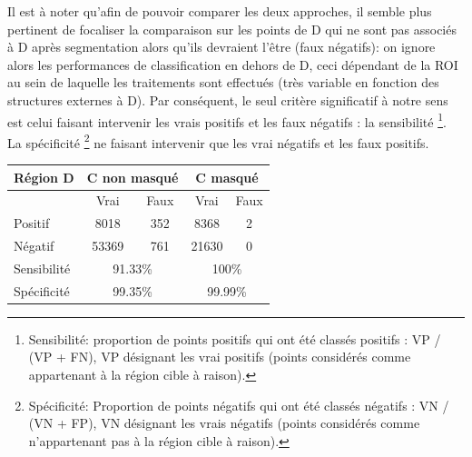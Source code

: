 Il est à noter qu'afin de pouvoir comparer les deux approches, il semble plus pertinent de focaliser la comparaison sur les points de D qui ne sont pas associés à D après segmentation alors qu'ils devraient l'être (faux négatifs): on ignore alors les performances de classification en dehors de D, ceci dépendant de la ROI au sein de laquelle les traitements sont effectués (très variable en fonction des structures externes à D). Par conséquent, le seul critère significatif à notre sens est celui faisant intervenir les vrais positifs et les faux négatifs : la sensibilité \footnote{Sensibilité: proportion de points positifs qui ont été classés positifs : VP / (VP + FN), VP désignant les vrai positifs (points considérés comme appartenant à la région cible à raison).}. La spécificité \footnote{Spécificité: Proportion de points négatifs qui ont été classés négatifs : VN / (VN + FP), VN désignant les vrais négatifs (points considérés comme n'appartenant pas à la région cible à raison).} ne faisant intervenir que les vrai négatifs et les faux positifs.

\begin{center}
	\begin{minipage}[b]{0.5\linewidth}
		\centering
			\begin{tabular}{|l|cccc|}
			\hline
				\textbf{Région D}& \multicolumn{2}{|c|}{\textbf{C non masqué}} 	& \multicolumn{2}{|c|}{\textbf{C masqué}} \\
				\hline
							& Vrai	& Faux 		& Vrai	& Faux 		\\
				\hline
					Positif	& 8018 	&  352 		& 8368 	& 2 	 	\\
				 	Négatif	& 53369 &  761		& 21630	& 0		\\
			\hline
				Sensibilité	& \multicolumn{2}{|c|}{91.33\%} 	& \multicolumn{2}{|c|}{100\%} \\
				Spécificité	& \multicolumn{2}{|c|}{99.35\%} 	& \multicolumn{2}{|c|}{99.99\%} \\
				\hline
			\end{tabular}
			\label{tab:mask_effect_D}
	\end{minipage}
\end{center}




